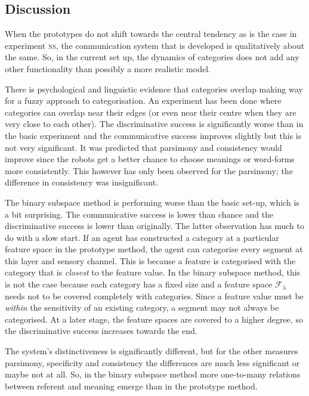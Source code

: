 \subsection{Discussion}

When the prototypes do not shift towards the central tendency as is the case in experiment {\scshape ns}, the communication system that is developed is qualitatively about the same. So, in the current set up, the dynamics of categories does not add any other functionality than possibly a more realistic model.


There is psychological and linguistic evidence that categories overlap making way for a fuzzy approach to categorisation. An experiment has been done where categories can overlap near their edges (or even near their centre when they are very close to each other). The discriminative success is significantly worse than in the basic experiment and the communicative success improves slightly but this is not very significant. It was predicted that parsimony and consistency would improve since the robots get a better chance to choose meanings or word-forms more consistently. This however has only been observed for the parsimony; the difference in consistency was insignificant.

The binary subspace method is performing worse than the basic set-up, which is a bit surprising. The communicative success is lower than chance and the discriminative success is lower than originally. The latter observation has much to do with a slow start. If an agent has constructed a category at a particular feature space in the prototype method, the agent can categorise every segment at this layer and sensory channel. This is because a feature is categorised with the category that is {\em closest} to the feature value. In the binary subspace method, this is not the case because each category has a fixed size and a feature space ${\mathcal F}_\lambda$ needs not to be covered completely with categories. Since a feature value must be {\em within} the sensitivity of an existing category, a segment may not always be categorised. At a later stage, the feature spaces are covered to a higher degree, so the discriminative success increases towards the end.

The system's distinctiveness is significantly different, but for the other measures parsimony, specificity and consistency the differences are much less significant or maybe not at all. So, in the binary subspace method more one-to-many relations between referent and meaning emerge than in the prototype method.

